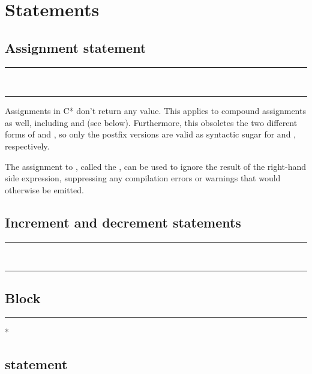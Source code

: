 
\chapter{Statements}

\section{Assignment statement}

\begin{grammar}
\rule{assignment-statement}  \code{=}  \code{;}\\
\rule{assignment-statement} \code{\_} \code{=}  \code{;}
\end{grammar}

Assignments in C* don't return any value. This applies to compound
assignments as well, including \code{++} and \code{--} (see below). Furthermore,
this obsoletes the two different forms of \code{++} and \code{--}, so only the
postfix versions are valid as syntactic sugar for  and ,
respectively.

The assignment to \code{\_}, called the , can
be used to ignore the result of the right-hand side expression, suppressing any
compilation errors or warnings that would otherwise be emitted.

\section{Increment and decrement statements}

\begin{grammar}
\rule{increment-statement}  \code{++} \code{;}\\
\rule{decrement-statement}  \code{--} \code{;}
\end{grammar}

\section{Block}

\begin{grammar}
\rule{block} \code{\{} * \code{\}}
\end{grammar}

\section{ statement}

